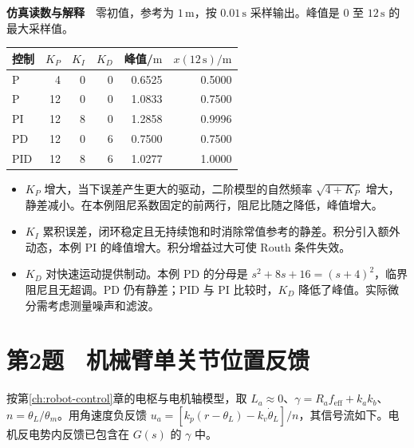 \textbf{仿真读数与解释}　零初值，参考为 $1\,\mathrm m$，按 $0.01\,\mathrm s$ 采样输出。峰值是 $0$ 至 $12\,\mathrm s$ 的最大采样值。
\begin{center}
\small
\begin{tabular}{@{}lrrrrr@{}}
\toprule
控制 & $K_P$ & $K_I$ & $K_D$ & 峰值/$\mathrm m$ & $x(12\,\mathrm s)/\mathrm m$ \\
\midrule
P   & 4  & 0 & 0 & 0.6525 & 0.5000 \\
P   & 12 & 0 & 0 & 1.0833 & 0.7500 \\
PI  & 12 & 8 & 0 & 1.2858 & 0.9996 \\
PD  & 12 & 0 & 6 & 0.7500 & 0.7500 \\
PID & 12 & 8 & 6 & 1.0277 & 1.0000 \\
\bottomrule
\end{tabular}
\end{center}
\begin{itemize}[nosep]
  \item $K_P$ 增大，当下误差产生更大的驱动，二阶模型的自然频率 $\sqrt{4+K_P}$ 增大，静差减小。在本例阻尼系数固定的前两行，阻尼比随之降低，峰值增大。
  \item $K_I$ 累积误差，闭环稳定且无持续饱和时消除常值参考的静差。积分引入额外动态，本例 PI 的峰值增大。积分增益过大可使 Routh 条件失效。
  \item $K_D$ 对快速运动提供制动。本例 PD 的分母是 $s^2+8s+16=(s+4)^2$，临界阻尼且无超调。PD 仍有静差；PID 与 PI 比较时，$K_D$ 降低了峰值。实际微分需考虑测量噪声和滤波。
\end{itemize}

\section*{第2题　机械臂单关节位置反馈}
\label{hw:control-2}
按第\ref{ch:robot-control}章的电枢与电机轴模型，取 $L_a\approx0$、$\gamma=R_a f_{\mathrm{eff}}+k_a k_b$、$n=\theta_L/\theta_m$。用角速度负反馈 $u_a=[k_p(r-\theta_L)-k_v\dot\theta_L]/n$，其信号流如下。电机反电势内反馈已包含在 $G(s)$ 的 $\gamma$ 中。

